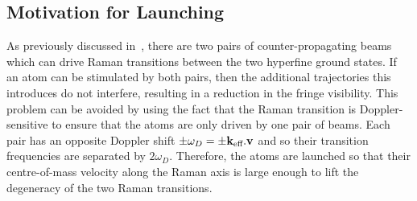 \subsection{Motivation for Launching}\label{subsec:launching}
As previously discussed in~, there
are two pairs of counter-propagating beams which can drive Raman
transitions between the two hyperfine ground states. If an atom can be
stimulated by both pairs, then the additional trajectories this
introduces do not interfere, resulting in a reduction in the fringe
visibility. This problem can be avoided by using the fact that the
Raman transition is Doppler-sensitive to ensure that the atoms are
only driven by one pair of beams. Each pair has an opposite Doppler
shift \(\pm \omega_D = \pm {\textbf k_\textnormal{eff}}.\textbf{v}\) and so their transition
frequencies are separated by \(2\omega_D\). Therefore, the atoms are
launched so that their centre-of-mass velocity along the Raman axis is
large enough to lift the degeneracy of the two Raman transitions. 

